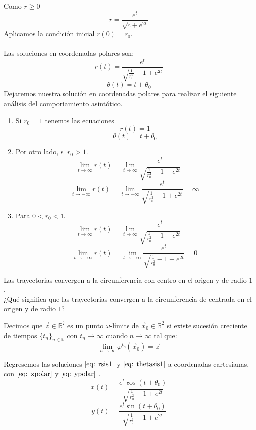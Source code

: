 Como $r\geq 0$
$$r=\frac{e^t}{\sqrt{c+e^{2t}}}$$
Aplicamos la condición inicial $r(0)=r_0$.\\
\\Las soluciones en coordenadas polares son:
\begin{equation}\label{eq: rsis1}
	r(t)=\frac{e^t}{\sqrt{\frac{1}{r_0^2}-1+e^{2t}}}
\end{equation}
\begin{equation}\label{eq: thetasis1}
	\theta(t)=t+\theta_0
\end{equation}
Dejaremos nuestra solución en coordenadas polares para realizar el siguiente
análisis del comportamiento asintótico.\\
\begin{enumerate}
	\item Si $r_0=1$ tenemos las ecuaciones
	      $$r(t)=1$$
	      $$\theta(t)=t+\theta_0$$
	\item Por otro lado, si $r_0>1$.
	      $$\lim_{t\to\infty}r(t)=\lim_{t\to\infty}\frac{e^t}{\sqrt{\frac{1}{r_0^2}-1+e^{2t}}}=1$$
	      $$\lim_{t\to-\infty}r(t)=\lim_{t\to-\infty}\frac{e^t}{\sqrt{\frac{1}{r_0^2}-1+e^{2t}}}=\infty$$
	\item Para $0<r_0<1$.
	      $$\lim_{t\to\infty}r(t)=\lim_{t\to\infty}\frac{e^t}{\sqrt{\frac{1}{r_0^2}-1+e^{2t}}}=1$$
	      $$\lim_{t\to-\infty}r(t)=\lim_{t\to-\infty}\frac{e^t}{\sqrt{\frac{1}{r_0^2}-1+e^{2t}}}=0$$
\end{enumerate}
Las trayectorias convergen a la circunferencia con centro en el origen
y de radio  $1$.\\

¿Qué significa que las trayectorias convergen a la circunferencia de centrada en el origen y de radio $1$?

\begin{definition} 
	Decimos que $\vec{z}\in\mathbb{R}^2$ es un punto $\omega$-límite
	de $\vec{x}_0\in\mathbb{R}^2$ si existe sucesión creciente de
	tiempos $\{t_n\}_{n\in\mathbb{N}}$
	con $t_n \to\infty$ cuando $n\to \infty$ tal que:
	$$\lim_{n\to\infty}\varphi^{t_n}(\vec{x}_0)=\vec{z}$$
\end{definition}

Regresemos las soluciones $\eqref{eq: rsis1}$ y $\eqref{eq: thetasis1}$ a
coordenadas cartesianas, con $\eqref{eq: xpolar}$ y $\eqref{eq: ypolar}$ \cite{guckenheimer1983nonlinear}.
\begin{equation}\label{eq: xsis1}
	x(t)=\frac{e^t\cos(t+\theta_0)}{\sqrt{\frac{1}{r_0^2}-1+e^{2t}}}
\end{equation}
\begin{equation}\label{eq: ysis1}
	y(t)=\frac{e^t\sin(t+\theta_0)}{\sqrt{\frac{1}{r_0^2}-1+e^{2t}}}
\end{equation}

